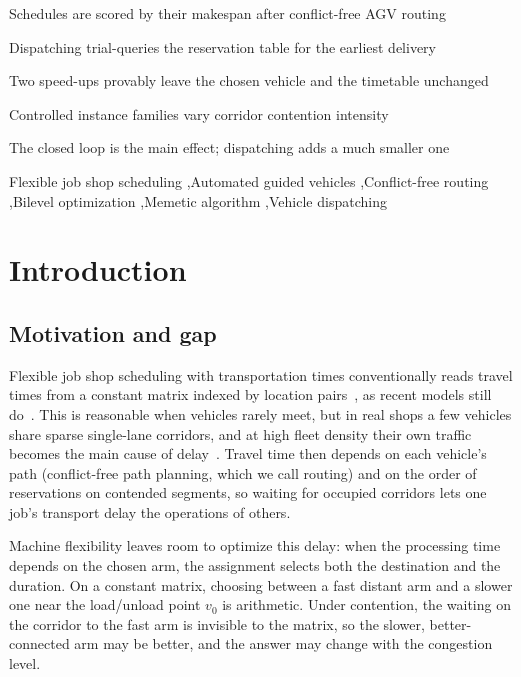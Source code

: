 \documentclass[preprint,review,12pt,authoryear]{elsarticle}
\begin{document}
\begin{frontmatter}
\ifdoubleblind\else
\begin{highlights}
\item Schedules are scored by their makespan after conflict-free AGV routing
\item Dispatching trial-queries the reservation table for the earliest delivery
\item Two speed-ups provably leave the chosen vehicle and the timetable unchanged
\item Controlled instance families vary corridor contention intensity
\item The closed loop is the main effect; dispatching adds a much smaller one
\end{highlights}
\fi

\begin{keyword}
Flexible job shop scheduling \sep Automated guided vehicles \sep Conflict-free routing \sep Bilevel optimization \sep Memetic algorithm \sep Vehicle dispatching
\end{keyword}

\end{frontmatter}

\linenumbers

\section{Introduction}
\label{sec:Chapter_I}

\subsection{Motivation and gap}

Flexible job shop scheduling with transportation times conventionally reads travel times from a constant matrix indexed by location pairs~\citep{xin2025review}, as recent models still do~\citep{meng2025cp,qin2026knowledge,jafarian2026integrated}.
This is reasonable when vehicles rarely meet, but in real shops a few vehicles share sparse single-lane corridors, and at high fleet density their own traffic becomes the main cause of delay~\citep{kim2026congestion}.
Travel time then depends on each vehicle's path (conflict-free path planning, which we call routing) and on the order of reservations on contended segments, so waiting for occupied corridors lets one job's transport delay the operations of others.

Machine flexibility leaves room to optimize this delay: when the processing time depends on the chosen arm, the assignment selects both the destination and the duration.
On a constant matrix, choosing between a fast distant arm and a slower one near the load/unload point $v_0$ is arithmetic.
Under contention, the waiting on the corridor to the fast arm is invisible to the matrix, so the slower, better-connected arm may be better, and the answer may change with the congestion level.
\end{document}
